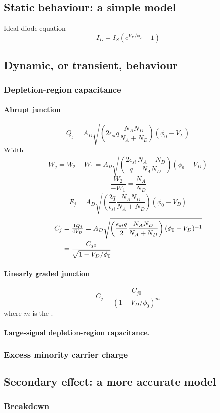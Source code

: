 \documentclass{report}
\begin{document}
\subsection{Static behaviour: a simple model}
Ideal diode equation
\[ I_D = I_S(e^{V_D/ \phi_T} - 1) \]
\subsection{Dynamic, or transient, behaviour}
\subsubsection{Depletion-region capacitance}
\paragraph{Abrupt junction}
\[ Q_j = A_D \sqrt{\left(2\epsilon_{si}q \frac{N_AN_D}{N_A+N_D}\right)(\phi_0 - V_D)} \]
Width
\[ W_j = W_2 - W_1 = A_D \sqrt{\left(\frac{2\epsilon_{si}}{q} \frac{N_A+N_D}{N_AN_D}\right)(\phi_0 - V_D)} \]
\[ \frac{W_2}{-W_1} = \frac{N_A}{N_D} \]
\[ E_j = A_D \sqrt{\left(\frac{2q}{\epsilon_{si}} \frac{N_AN_D}{N_A+N_D}\right)(\phi_0 - V_D)} \]
\begin{align*}
C_j &= \od{Q_j}{V_D} = A_D \sqrt{\left(\frac{\epsilon_{si}q}{2} \frac{N_AN_D}{N_A+N_D}\right)(\phi_0 - V_D)^{-1}} \\
&= \frac{C_{j0}}{\sqrt{1-V_D/ \phi_0}}
\end{align*}
\paragraph{Linearly graded junction}
\[ C_j = \frac{C_{j0}}{(1-V_D/ \phi_0)^m} \]
where $m$ is the .
\paragraph{Large-signal depletion-region capacitance.}
\subsubsection{Excess minority carrier charge}
\subsection{Secondary effect: a more accurate model}
\subsubsection{Breakdown}
\end{document}

